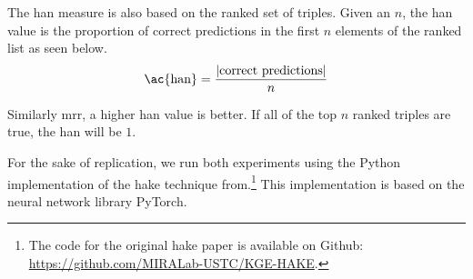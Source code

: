 The \ac{han} measure is also based on the ranked set of triples.
Given an $n$, the \ac{han} value is the proportion of correct predictions in the first $n$ elements of the ranked list as seen below.
\begin{equation}\label{eq:han}
  \text{\ac{han}} = \frac{|\text{correct predictions}|}{n}
\end{equation}

Similarly \ac{mrr}, a higher \ac{han} value is better.
If all of the top $n$ ranked triples are true, the \ac{han} will be $1$.

For the sake of replication, we run both experiments using the Python implementation of the \ac{hake} technique from\cite{Zhang2019}.\footnote{The code for the original \ac{hake} paper is available on Github: \url{https://github.com/MIRALab-USTC/KGE-HAKE}.}
This implementation is based on the neural network library PyTorch.
